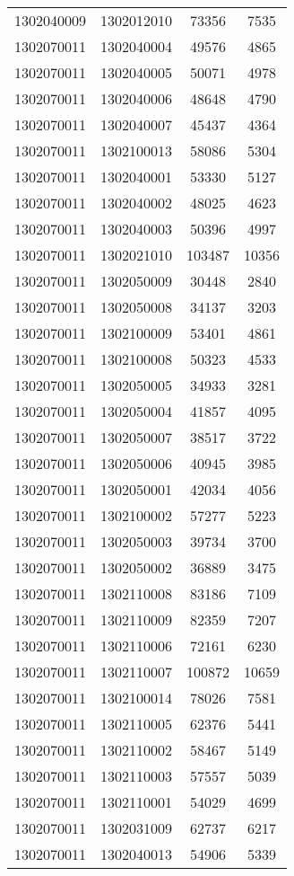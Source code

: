\begin{longtable}{llcc}
1302040009 & 1302012010 & 73356 & 7535\\
1302070011 & 1302040004 & 49576 & 4865\\
1302070011 & 1302040005 & 50071 & 4978\\
1302070011 & 1302040006 & 48648 & 4790\\
1302070011 & 1302040007 & 45437 & 4364\\
1302070011 & 1302100013 & 58086 & 5304\\
1302070011 & 1302040001 & 53330 & 5127\\
1302070011 & 1302040002 & 48025 & 4623\\
1302070011 & 1302040003 & 50396 & 4997\\
1302070011 & 1302021010 & 103487 & 10356\\
1302070011 & 1302050009 & 30448 & 2840\\
1302070011 & 1302050008 & 34137 & 3203\\
1302070011 & 1302100009 & 53401 & 4861\\
1302070011 & 1302100008 & 50323 & 4533\\
1302070011 & 1302050005 & 34933 & 3281\\
1302070011 & 1302050004 & 41857 & 4095\\
1302070011 & 1302050007 & 38517 & 3722\\
1302070011 & 1302050006 & 40945 & 3985\\
1302070011 & 1302050001 & 42034 & 4056\\
1302070011 & 1302100002 & 57277 & 5223\\
1302070011 & 1302050003 & 39734 & 3700\\
1302070011 & 1302050002 & 36889 & 3475\\
1302070011 & 1302110008 & 83186 & 7109\\
1302070011 & 1302110009 & 82359 & 7207\\
1302070011 & 1302110006 & 72161 & 6230\\
1302070011 & 1302110007 & 100872 & 10659\\
1302070011 & 1302100014 & 78026 & 7581\\
1302070011 & 1302110005 & 62376 & 5441\\
1302070011 & 1302110002 & 58467 & 5149\\
1302070011 & 1302110003 & 57557 & 5039\\
1302070011 & 1302110001 & 54029 & 4699\\
1302070011 & 1302031009 & 62737 & 6217\\
1302070011 & 1302040013 & 54906 & 5339\\

\end{longtable}
